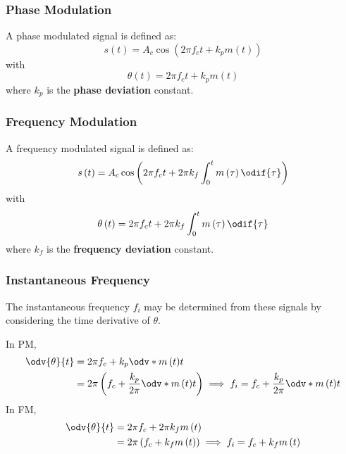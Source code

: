 \documentclass{article}
\begin{document}
\subsubsection{Phase Modulation}
A phase modulated signal is defined as:
\begin{equation*}
    s\left( t \right) = A_c \cos{\left( 2\pi f_c t + k_p m\left( t \right) \right)}
\end{equation*}
with
\begin{equation*}
    \theta\left( t \right) = 2\pi f_c t + k_p m\left( t \right)
\end{equation*}
where \(k_p\) is the \textbf{phase deviation} constant.
\subsubsection{Frequency Modulation}
A frequency modulated signal is defined as:
\begin{equation*}
    s\left( t \right) = A_c \cos{\left( 2\pi f_c t + 2\pi k_f \int_0^t m\left( \tau \right) \odif{\tau} \right)}
\end{equation*}
with
\begin{equation*}
    \theta\left( t \right) = 2\pi f_c t + 2\pi k_f \int_0^t m\left( \tau \right) \odif{\tau}
\end{equation*}
where \(k_f\) is the \textbf{frequency deviation} constant.
\subsubsection{Instantaneous Frequency}
The instantaneous frequency \(f_i\) may be determined from these signals by considering the time derivative of \(\theta\).

In PM,
\begin{align*}
    \odv{\theta}{t} & = 2\pi f_c + k_p \odv*{m\left( t \right)}{t}                                                                                               \\
                    & = 2\pi \left( f_c + \frac{k_p}{2\pi} \odv*{m\left( t \right)}{t} \right) \implies f_i = f_c + \frac{k_p}{2\pi} \odv*{m\left( t \right)}{t}
\end{align*}
In FM,
\begin{align*}
    \odv{\theta}{t} & = 2\pi f_c + 2\pi k_f m\left( t \right)                                                      \\
                    & = 2\pi \left( f_c + k_f m\left( t \right) \right) \implies f_i = f_c + k_f m\left( t \right)
\end{align*}
\end{document}
